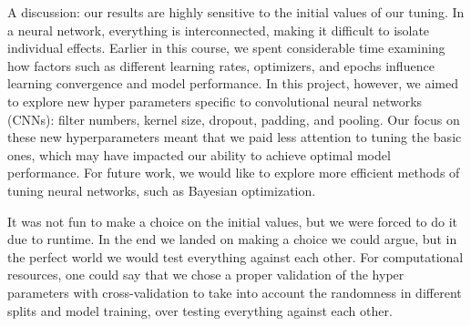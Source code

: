 A discussion: our results are highly sensitive to the initial values of our tuning. In a neural network, everything is interconnected, making it difficult to isolate individual effects. Earlier in this course, we spent considerable time examining how factors such as different learning rates, optimizers, and epochs influence learning convergence and model performance. In this project, however, we aimed to explore new hyper parameters specific to convolutional neural networks (CNNs): filter numbers, kernel size, dropout, padding, and pooling. Our focus on these new hyperparameters meant that we paid less attention to tuning the basic ones, which may have impacted our ability to achieve optimal model performance. For future work, we would like to explore more efficient methods of tuning neural networks, such as Bayesian optimization.

It was not fun to make a choice on the initial values, but we were forced to do it due to runtime. In the end we landed on making a choice we could argue, but in the perfect world we would test everything against each other. For computational resources, one could say that we chose a proper validation of the hyper parameters with cross-validation to take into account the randomness in different splits and model training, over testing everything against each other. 